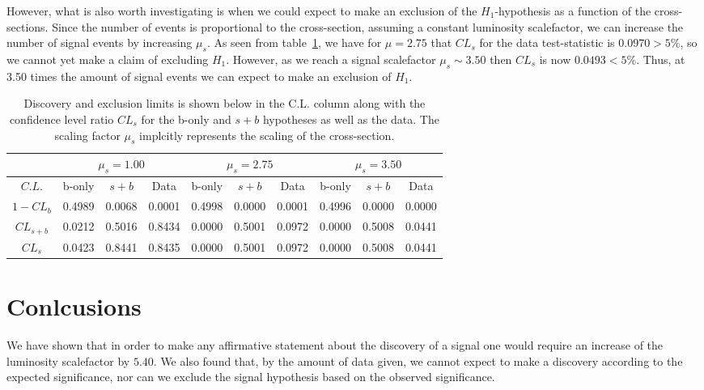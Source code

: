 \documentclass[12pt,a4paper]{amsart}
\begin{document}
However, what is also worth investigating is when we could expect to make an exclusion of the $H_1$-hypothesis as a function of the cross-sections. Since the number of events is proportional to the cross-section, assuming a constant luminosity scalefactor, we can increase the number of signal events by increasing $\mu_s$. As seen from table~\ref{tab:discovery_exclusion_confidence_levels}, we have for $\mu=2.75$ that $CL_s$ for the data test-statistic is $0.0970>5\%$, so we cannot yet make a claim of excluding $H_1$. However, as we reach a signal scalefactor $\mu_s \sim 3.50$ then $CL_s$ is now $0.0493<5\%$. Thus, at 3.50 times the amount of signal events we can expect to make an exclusion of $H_1$.

\begin{table}[]
\caption{Discovery and exclusion limits is shown below in the C.L. column along with the confidence level ratio $CL_s$ for the b-only and $s+b$ hypotheses as well as the data. The scaling factor $\mu_s$ implcitly represents the scaling of the cross-section.}
\label{tab:discovery_exclusion_confidence_levels}
\begin{tabular}{c|ccc|ccc|ccc}
\hline\hline
           & \multicolumn{3}{c|}{$\mu_s = 1.00$} & \multicolumn{3}{c|}{$\mu_s = 2.75$} & \multicolumn{3}{c}{$\mu_s = 3.50$} \\ \hline
$C.L.$     & b-only    & $s+b$     & Data      & b-only    & $s+b$     & Data      & b-only    & $s+b$     & Data     \\ \hline
$1-CL_b$   & 0.4989    & 0.0068    & 0.0001    & 0.4998    & 0.0000    & 0.0001    & 0.4996    & 0.0000    & 0.0000   \\
$CL_{s+b}$ & 0.0212    & 0.5016    & 0.8434    & 0.0000    & 0.5001    & 0.0972    & 0.0000    & 0.5008    & 0.0441   \\
$CL_s$     & 0.0423    & 0.8441    & 0.8435    & 0.0000    & 0.5001    & 0.0972    & 0.0000    & 0.5008    & 0.0441   \\ \hline\hline
\end{tabular}
\end{table}

\section{Conlcusions}
We have shown that in order to make any affirmative statement about the discovery of a signal one would require an increase of the luminosity scalefactor by $5.40$. We also found that, by the amount of data given, we cannot expect to make a discovery according to the expected significance, nor can we exclude the signal hypothesis based on the observed significance.


\printbibliography
\end{document}
